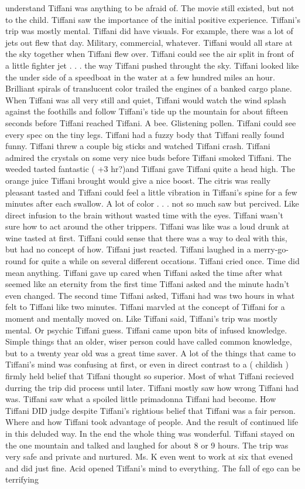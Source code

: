 \documentclass[12pt]{book}
\begin{document}
understand Tiffani was anything to be afraid of. The movie still existed, but not to the child. Tiffani saw the importance of the initial positive experience. Tiffani's trip was mostly mental. Tiffani did have visuals. For example, there was a lot of jets out flew that day. Military, commercial, whatever. Tiffani would all stare at the sky together when Tiffani flew over. Tiffani could see the air split in front of a little fighter jet . . .  the way Tiffani pushed throught the sky. Tiffani looked like the under side of a speedboat in the water at a few hundred miles an hour. Brilliant spirals of translucent color trailed the engines of a banked cargo plane. When Tiffani was all very still and quiet, Tiffani would watch the wind splash against the foothills and follow Tiffani's tide up the mountain for about fifteen seconds before Tiffani reached Tiffani. A bee. Glistening pollen. Tiffani could see every spec on the tiny legs. Tiffani had a fuzzy body that Tiffani really found funny. Tiffani threw a couple big sticks and watched Tiffani crash. Tiffani admired the crystals on some very nice buds before Tiffani smoked Tiffani. The weeded tasted fantastic ( +3 hr?)and Tiffani gave Tiffani quite a head high. The orange juice Tiffani brought would give a nice boost. The citris was really pleasant tasted and Tiffani could feel a little vibration in Tiffani's spine for a few minutes after each swallow. A lot of color . . .  not so much saw but percived. Like direct infusion to the brain without wasted time with the eyes. Tiffani wasn't sure how to act around the other trippers. Tiffani was like was a loud drunk at wine tasted at first. Tiffani could sense that there was a way to deal with this, but had no concept of how. Tiffani just reacted. Tiffani laughed in a merry-go-round for quite a while on several different occations. Tiffani cried once. Time did mean anything. Tiffani gave up cared when Tiffani asked the time after what seemed like an eternity from the first time Tiffani asked and the minute hadn't even changed. The second time Tiffani asked, Tiffani had was two hours in what felt to Tiffani like two minutes. Tiffani marvled at the concept of Tiffani for a moment and mentally moved on. Like Tiffani said, Tiffani's trip was mostly mental. Or psychic Tiffani guess. Tiffani came upon bits of infused knowledge. Simple things that an older, wiser person could have called common knowledge, but to a twenty year old was a great time saver. A lot of the things that came to Tiffani's mind was confusing at first, or even in direct contrast to a ( childish ) firmly held belief that Tiffani thought so superior. Most of what Tiffani recieved durring the trip did process until later. Tiffani mostly saw how wrong Tiffani had was. Tiffani saw what a spoiled little primadonna Tiffani had become. How Tiffani DID judge despite Tiffani's rightious belief that Tiffani was a fair person. Where and how Tiffani took advantage of people. And the result of continued life in this deluded way. In the end the whole thing was wonderful. Tiffani stayed on the one mountain and talked and laughed for about 8 or 9 hours. The trip was very safe and private and nurtured. Ms. K even went to work at six that evened and did just fine. Acid opened Tiffani's mind to everything. The fall of ego can be terrifying 
\end{document}
